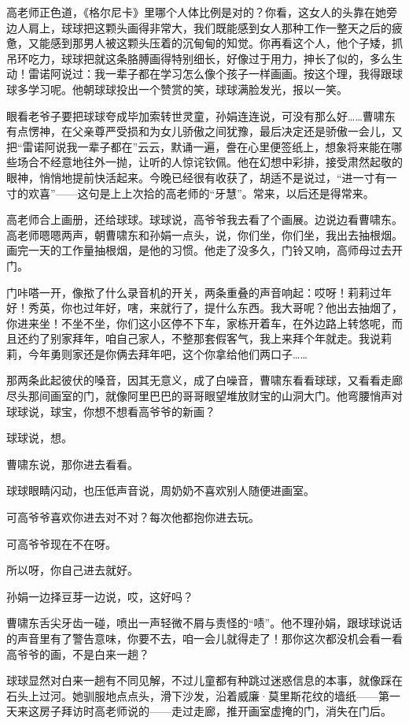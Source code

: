 \documentclass[lang=cn,newtx,12pt,scheme=chinese]{elegantbook}
\begin{document}
高老师正色道，《格尔尼卡》里哪个人体比例是对的？你看，这女人的头靠在她旁边人肩上，球球把这颗头画得非常大，我们既能感到女人那种工作一整天之后的疲惫，又能感到那男人被这颗头压着的沉甸甸的知觉。你再看这个人，他个子矮，抓吊环吃力，球球把就这条胳膊画得特别细长，好像过于用力，抻长了似的，多么生动！雷诺阿说过：我一辈子都在学习怎么像个孩子一样画画。按这个理，我得跟球球多学习呢。他朝球球投出一个赞赏的笑，球球满脸发光，报以一笑。

眼看老爷子要把球球夸成毕加索转世灵童，孙娟连连说，可没有那么好……曹啸东有点愣神，在父亲尊严受损和为女儿骄傲之间犹豫，最后决定还是骄傲一会儿，又把“雷诺阿说我一辈子都在”云云，默诵一遍，誊在心里便签纸上，想象将来能在哪些场合不经意地往外一抛，让听的人惊诧钦佩。他在幻想中彩排，接受肃然起敬的眼神，悄悄地提前快活起来。今晚已经很有收获了，胡适不是说过，“进一寸有一寸的欢喜”——这句是上上次拾的高老师的“牙慧”。常来，以后还是得常来。

高老师合上画册，还给球球。球球说，高爷爷我去看了个画展。边说边看曹啸东。高老师嗯嗯两声，朝曹啸东和孙娟一点头，说，你们坐，你们坐，我出去抽根烟。画完一天的工作量抽根烟，是他的习惯。他走了没多久，门铃又响，高师母过去开门。

门咔嗒一开，像揿了什么录音机的开关，两条重叠的声音响起：哎呀！莉莉过年好！秀英，你也过年好，嗐，来就行了，提什么东西。我大哥呢？他出去抽烟了，你进来坐！不坐不坐，你们这小区停不下车，家栋开着车，在外边路上转悠呢，而且还约了别家拜年，咱自己家人，不整那套假客气，我上来拜个年就走。我说莉莉，今年勇则家还是你俩去拜年吧，这个你拿给他们两口子……

那两条此起彼伏的嗓音，因其无意义，成了白噪音，曹啸东看看球球，又看看走廊尽头那间画室的门，就像阿里巴巴的哥哥眼望堆放财宝的山洞大门。他弯腰悄声对球球说，球宝，你想不想看高爷爷的新画？

球球说，想。

曹啸东说，那你进去看看。

球球眼睛闪动，也压低声音说，周奶奶不喜欢别人随便进画室。

可高爷爷喜欢你进去对不对？每次他都抱你进去玩。

可高爷爷现在不在呀。

所以呀，你自己进去就好。

孙娟一边择豆芽一边说，哎，这好吗？

曹啸东舌尖牙齿一碰，喷出一声轻微不屑与责怪的“啧”。他不理孙娟，跟球球说话的声音里有了警告意味，你要不去，咱一会儿就得走了！那你这次都没机会看一看高爷爷的画，不是白来一趟？

球球显然对白来一趟有不同见解，不过儿童都有种跳过迷惑信息的本事，就像踩在石头上过河。她驯服地点点头，滑下沙发，沿着威廉·莫里斯花纹的墙纸——第一天来这房子拜访时高老师说的——走过走廊，推开画室虚掩的门，消失在门后。
\end{document}
